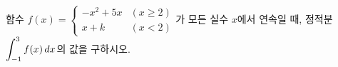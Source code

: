 함수 $f(x)=\begin{cases} -x^2+5x & (x\ge 2) \\ x+k & (x<2) \end{cases}$가 모든 실수 $x$에서 연속일 때, 정적분 $\displaystyle\int_{-1}^{3} f(x)\mkern3mu dx$의 값을 구하시오. 
